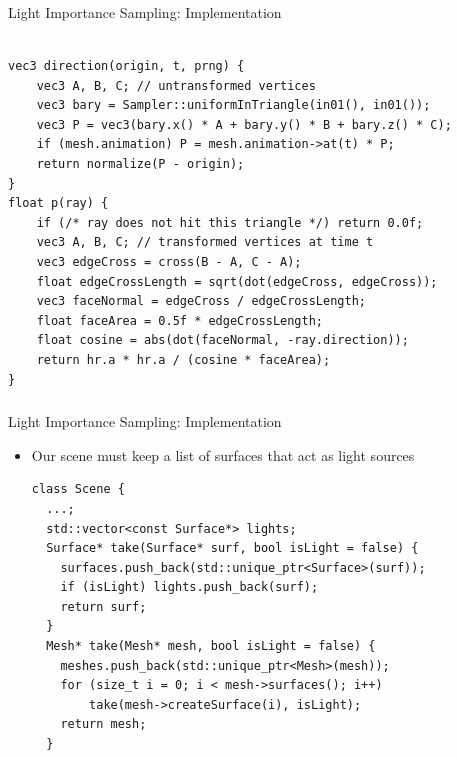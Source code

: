 \documentclass[utf8,stillsansserifmath,fleqn,t]{beamer}
\begin{document}
\begin{frame}[fragile]
\frametitle{\insertsection}
Light Importance Sampling: Implementation\\~\\
\begin{lstlisting}
vec3 direction(origin, t, prng) {
    vec3 A, B, C; // untransformed vertices
    vec3 bary = Sampler::uniformInTriangle(in01(), in01());
    vec3 P = vec3(bary.x() * A + bary.y() * B + bary.z() * C);
    if (mesh.animation) P = mesh.animation->at(t) * P;
    return normalize(P - origin);
}
float p(ray) {
    if (/* ray does not hit this triangle */) return 0.0f;
    vec3 A, B, C; // transformed vertices at time t
    vec3 edgeCross = cross(B - A, C - A);
    float edgeCrossLength = sqrt(dot(edgeCross, edgeCross));
    vec3 faceNormal = edgeCross / edgeCrossLength;
    float faceArea = 0.5f * edgeCrossLength;
    float cosine = abs(dot(faceNormal, -ray.direction));
    return hr.a * hr.a / (cosine * faceArea);
}
\end{lstlisting}
\end{frame}

\begin{frame}[fragile]
\frametitle{\insertsection}
Light Importance Sampling: Implementation
\begin{itemize}
\item Our scene must keep a list of surfaces that act as light sources
\begin{lstlisting}
class Scene {
  ...;
  std::vector<const Surface*> lights;
  Surface* take(Surface* surf, bool isLight = false) {
    surfaces.push_back(std::unique_ptr<Surface>(surf));
    if (isLight) lights.push_back(surf);
    return surf;
  }
  Mesh* take(Mesh* mesh, bool isLight = false) {
    meshes.push_back(std::unique_ptr<Mesh>(mesh));
    for (size_t i = 0; i < mesh->surfaces(); i++)
        take(mesh->createSurface(i), isLight);
    return mesh;
  }
\end{lstlisting}
\end{itemize}
\end{frame}
\end{document}
